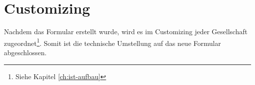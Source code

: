\section{Customizing}

Nachdem das Formular erstellt wurde, wird es im Customizing jeder Gesellschaft zugeordnet\footnote{Siehe Kapitel \ref{ch:ist-aufbau}}. Somit ist die technische Umstellung auf das neue Formular abgeschlossen.






	

